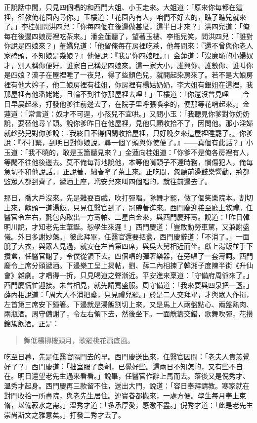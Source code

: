 正說話中間，只見四個唱的和西門大姐、小玉走來。大姐道：「原來你每都在這裡，卻教俺花園內尋你。」玉樓道：「花園內有人，咱們不好去的，瞧了瞧兒就來了。」李桂姐問洪四兒：「你每四個在後邊做甚麼，這半日才來？」洪四兒道：「俺每在後邊四娘房裡吃茶來。」潘金蓮聽了，望著玉樓、李瓶兒笑，問洪四兒：「誰對你說是四娘來？」董嬌兒道：「他留俺每在房裡吃茶，他每問來：『還不曾與你老人家磕頭，不知娘是幾娘？』他便說：『我是你四娘哩。』」金蓮道：「沒廉恥的小婦奴才，別人稱你便好，誰家自己稱是四娘來。這一家大小，誰興你、誰數你、誰叫你是四娘？漢子在屋裡睡了一夜兒，得了些顏色兒，就開起染房來了。若不是大娘房裡有他大妗子，他二娘房裡有桂姐，你房裡有楊姑奶奶，李大姐有銀姐在這裡，我那屋裡有他潘姥姥，且輪不到往你那屋裡去哩！」玉樓道：「你還沒曾見哩——今日早晨起來，打發他爹往前邊去了，在院子里呼張喚李的，便那等花哨起來。」金蓮道：「常言道：奴才不可逞，小孩兒不宜哄。」又問小玉：「我聽見你爹對你奶奶說，要替他尋丫頭。說你爹昨日在他屋裡，見他只顧收拾不了，因問他。那小淫婦就趁勢兒對你爹說：『我終日不得個閑收拾屋裡，只好晚夕來這屋裡睡罷了。』你爹說：『不打緊，到明日對你娘說，尋一個丫頭與你使便了。』——真個有此話？」小玉道：「我不曉的，敢是玉簫聽見來？」金蓮向桂姐道：「你爹不是俺各房裡有人，等閑不往他後邊去。莫不俺每背地說他，本等他嘴頭子不達時務，慣傷犯人，俺每急切不和他說話。」正說著，繡春拿了茶上來。正吃間，忽聽前邊鼓樂響動，荊都監眾人都到齊了，遞酒上座，玳安兒來叫四個唱的，就往前邊去了。

那日，喬大戶沒來。先是雜耍百戲，吹打彈唱。隊舞才罷，做了個笑樂院本。割切上來，獻頭一道湯飯。只見任醫官到了，冠帶著進來。西門慶迎接至廳上敘禮。任醫官令左右，氈包內取出一方壽帕、二星白金來，與西門慶拜壽。說道：「昨日韓明川說，才知老先生華誕。恕學生來遲！」西門慶道：「豈敢動勞車駕，又兼謝盛儀。外日多謝妙藥。」彼此拜畢，任醫官還要把盞，西門慶辭道：「不消了。」一面脫了大衣，與眾人見過，就安在左首第四席，與吳大舅相近而坐。獻上湯飯並手下攢盒，任醫官謝了，令僕從領下去。四個唱的彈著樂器，在旁唱了一套壽詞。西門慶令上席分頭遞酒。下邊樂工呈上揭帖，劉、薛二內相揀了韓湘子度陳半街《升仙會》雜劇。才唱得一折，只見喝道之聲漸近。平安進來稟道：「守備府周爺來了。」西門慶慌忙迎接。未曾相見，就先請寬盛服。周守備道：「我來要與四泉把一盞。」薛內相說道：「周大人不消把盞，只見禮兒罷。」於是二人交拜畢，才與眾人作揖，左首第三席安下鐘箸。下邊就是湯飯割切上來，又是馬上人兩盤點心、兩盤熟肉、兩瓶酒。周守備謝了，令左右領下去，然後坐下。一面觥籌交錯，歌舞吹彈，花攢錦簇飲酒。正是：
\begin{quote}
舞低楊柳樓頭月，歌罷桃花扇底風。
\end{quote}

吃至日暮，先是任醫官隔門去的早。西門慶送出來，任醫官因問：「老夫人貴恙覺好了？」西門慶道：「拙室服了良劑，已覺好些。這兩日不知怎的，又有些不自在。明日還望老先生過來看看。」說畢，任醫官作辭上馬而去。落後又是倪秀才、溫秀才起身。西門慶再三款留不住，送出大門，說道：「容日奉拜請教。寒家就在對門收拾一所書院，與老先生居住。連寶眷都搬來，一處方便。學生每月奉上束脩，以備菽水之需。」溫秀才道：「多承厚愛，感激不盡。」倪秀才道：「此是老先生崇尚斯文之雅意矣。」打發二秀才去了。

